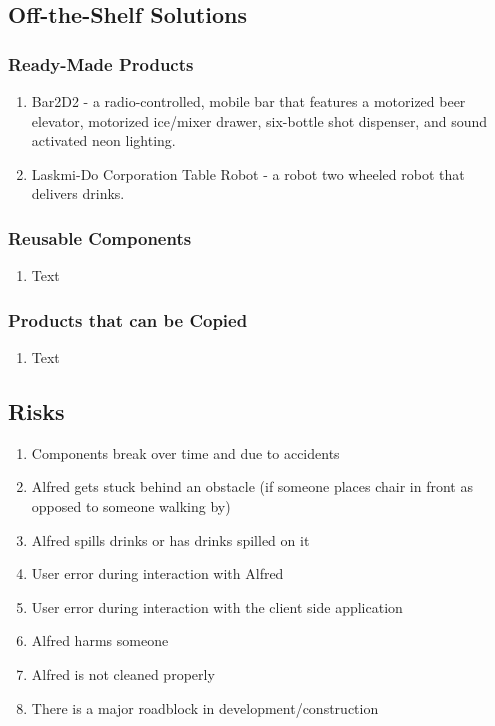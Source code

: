 \documentclass [11pt]{article}
\begin{document}
\subsection{Off-the-Shelf Solutions}

\subsubsection{Ready-Made Products}
	\begin{enumerate}[label=\textbf{(\roman*)}]
		\item Bar2D2 - a radio-controlled, mobile bar that features a motorized beer elevator, motorized ice/mixer drawer, six-bottle shot dispenser, and sound activated neon lighting. 
		\item Laskmi-Do Corporation Table Robot - a robot two wheeled robot that delivers drinks.
	\end{enumerate}
	
\subsubsection{Reusable Components}
	\begin{enumerate}[label=\textbf{(\roman*)}]
		\item Text
	\end{enumerate}

\subsubsection{Products that can be Copied}
	\begin{enumerate}[label=\textbf{(\roman*)}]
		\item Text
	\end{enumerate}

\subsection{Risks}
	\begin{enumerate}[label=\textbf{(\roman*)}]
		\item Components break over time and due to accidents
		\item Alfred gets stuck behind an obstacle (if someone places chair in front as opposed to someone walking by)
		\item Alfred spills drinks or has drinks spilled on it
		\item User error during interaction with Alfred
		\item User error during interaction with the client side application
		\item Alfred harms someone
		\item Alfred is not cleaned properly
		\item There is a major roadblock in development/construction
	\end{enumerate}
\end{document}
